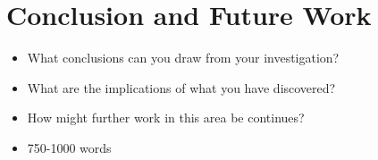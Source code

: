\section{Conclusion and Future Work}

\begin{itemize}
    \item What conclusions can you draw from your investigation?
    \item What are the implications of what you have discovered?
    \item How might further work in this area be continues?
    \item 750-1000 words
\end{itemize}

